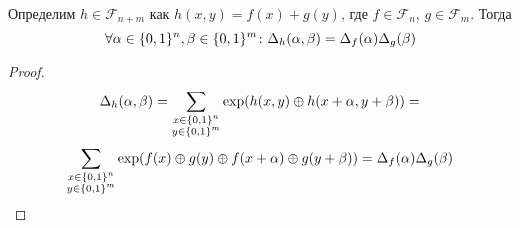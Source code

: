 \begin{theorem}
Определим $h \in \mathscr{F}_{n+m}$ как $h(x,y) = f(x) + g(y)$, где
$f \in \mathscr{F}_n,\, g \in \mathscr{F}_m$. Тогда
   $$\forall \alpha \in \{0,1\}^n, \beta \in \{0,1\}^m\colon 
                  \Delta_h(\alpha, \beta) = \Delta_f(\alpha) \Delta_g(\beta)$$
\end{theorem}

\begin{proof}
$$\Delta_h (\alpha, \beta) = 
\sum\limits_{\substack{x \in \{0,1\}^n \\ y \in \{0,1\}^m}} 
\exp( h(x,y) \oplus h(x+\alpha, y+\beta)) = $$ 
$$\sum\limits_{\substack{x \in \{0,1\}^n \\ y \in \{0,1\}^m}}
\exp(f(x) \oplus g(y) \oplus f(x + \alpha) \oplus g(y + \beta)) = \Delta_f(\alpha) \Delta_g(\beta)$$
\end{proof}
